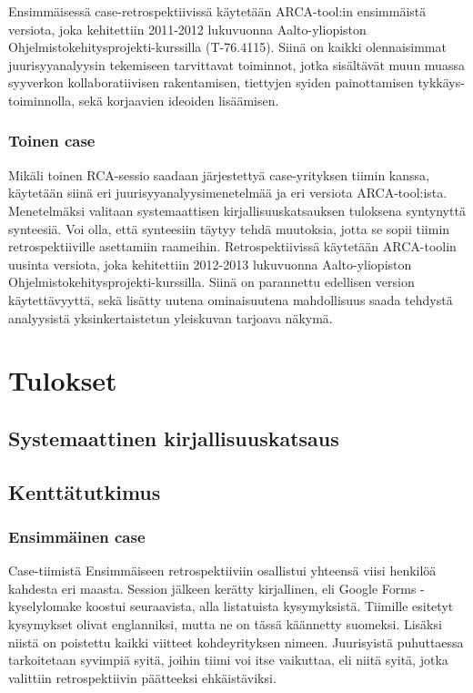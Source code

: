 Ensimmäisessä case-retrospektiivissä käytetään ARCA-tool:in ensimmäistä versiota, joka kehitettiin 2011-2012 lukuvuonna Aalto-yliopiston Ohjelmistokehitysprojekti-kurssilla (T-76.4115). Siinä on kaikki olennaisimmat juurisyyanalyysin tekemiseen tarvittavat toiminnot, jotka sisältävät muun muassa syyverkon kollaboratiivisen rakentamisen, tiettyjen syiden painottamisen tykkäys-toiminnolla, sekä korjaavien ideoiden lisäämisen.

\subsubsection{Toinen case}
Mikäli toinen RCA-sessio saadaan järjestettyä case-yrityksen tiimin kanssa, käytetään siinä eri juurisyyanalyysimenetelmää ja eri versiota ARCA-tool:ista. Menetelmäksi valitaan systemaattisen kirjallisuuskatsauksen tuloksena syntynyttä synteesiä. Voi olla, että synteesiin täytyy tehdä muutoksia, jotta se sopii tiimin retrospektiiville asettamiin raameihin. Retrospektiivissä käytetään ARCA-toolin uusinta versiota, joka kehitettiin 2012-2013 lukuvuonna Aalto-yliopiston Ohjelmistokehitysprojekti-kurssilla. Siinä on parannettu edellisen version käytettävyyttä, sekä lisätty uutena ominaisuutena mahdollisuus saada tehdystä analyysistä yksinkertaistetun yleiskuvan tarjoava näkymä.

\section{Tulokset}
\subsection{Systemaattinen kirjallisuuskatsaus}
\subsection{Kenttätutkimus}
\subsubsection{Ensimmäinen case}
Case-tiimistä Ensimmäiseen retrospektiiviin osallistui yhteensä viisi henkilöä kahdesta eri maasta.
Session jälkeen kerätty kirjallinen, eli Google Forms -kyselylomake koostui seuraavista, alla listatuista kysymyksistä. Tiimille esitetyt kysymykset olivat englanniksi, mutta ne on tässä käännetty suomeksi. Lisäksi niistä on poistettu kaikki viitteet kohdeyrityksen nimeen. Juurisyistä puhuttaessa tarkoitetaan syvimpiä syitä, joihin tiimi voi itse vaikuttaa, eli niitä syitä, jotka valittiin retrospektiivin päätteeksi ehkäistäviksi.

